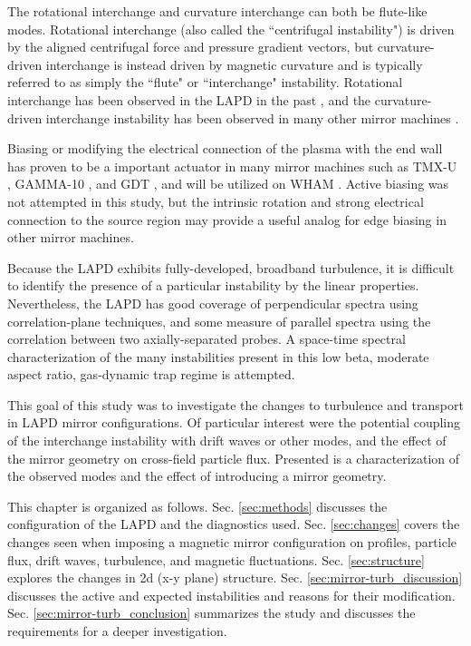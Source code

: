 The rotational interchange and curvature interchange can both be flute-like modes. Rotational interchange (also called the ``centrifugal instability") is driven by the aligned centrifugal force and pressure gradient vectors, but curvature-driven interchange is instead driven by magnetic curvature and is typically referred to as simply the ``flute" or ``interchange" instability. Rotational interchange \cite{Jassby_transverse_1972} has been observed in the LAPD in the past \cite{Schaffner_2012, Schaffner_2013}, and the curvature-driven interchange instability has been observed in many other mirror machines \cite{wickham_curvature-induced_1982, ferron_interchange_1983, Post_1987}. 

Biasing or modifying the electrical connection of the plasma with the end wall has proven to be a important actuator in many mirror machines such as TMX-U \cite{Hooper_1984}, GAMMA-10 \cite{Mase_1991}, and GDT \cite{Bagryansky_2003, Bagryansky_2007, Beklemishev_2010}, and will be utilized on WHAM \cite{WHAM}. Active biasing was not attempted in this study, but the intrinsic rotation and strong electrical connection to the source region may provide a useful analog for edge biasing in other mirror machines.

Because the LAPD exhibits fully-developed, broadband turbulence, it is difficult to identify the presence of a particular instability by the linear properties.  
Nevertheless, the LAPD has good coverage of perpendicular spectra using correlation-plane techniques, and some measure of parallel spectra using the correlation between two axially-separated probes. A space-time spectral characterization of the many instabilities present in this low beta, moderate aspect ratio, gas-dynamic trap regime is attempted.

This goal of this study was to investigate the changes to turbulence and transport in LAPD mirror configurations. Of particular interest were the potential coupling of the interchange instability with drift waves or other modes, and the effect of the mirror geometry on cross-field particle flux. Presented is a characterization of the observed modes and the effect of introducing a mirror geometry.

This chapter is organized as follows. Sec. \ref{sec:methods} discusses the configuration of the LAPD and the diagnostics used. Sec. \ref{sec:changes} covers the changes seen when imposing a magnetic mirror configuration on profiles, particle flux, drift waves, turbulence, and magnetic fluctuations. Sec. \ref{sec:structure} explores the changes in 2d (x-y plane) structure. Sec. \ref{sec:mirror-turb_discussion} discusses the active and expected instabilities and reasons for their modification. Sec. \ref{sec:mirror-turb_conclusion} summarizes the study and discusses the requirements for a deeper investigation.

